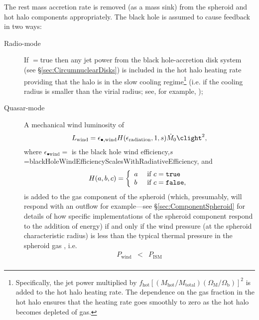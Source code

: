 The rest mass accretion rate is removed (as a mass sink) from the spheroid and hot halo components appropriately. The black hole is assumed to cause feedback in two ways:
\begin{description}
 \item [Radio-mode] If {\normalfont \ttfamily [blackHoleHeatsHotHalo]}$=${\normalfont \ttfamily true} then any jet power from the black hole-accretion disk system (see \S\ref{sec:CircumnuclearDisks}) is included in the hot halo heating rate providing that the halo is in the slow cooling regime\footnote{Specifically, the jet power multiplied by $f_\mathrm{hot} [(M_\mathrm{hot}/M_\mathrm{total}) (\Omega_\mathrm{M}/\Omega_\mathrm{b})]^2$ is added to the hot halo heating rate. The dependence on the gas fraction in the hot halo ensures that the heating rate goes smoothly to zero as the hot halo becomes depleted of gas.} (i.e. if the cooling radius is smaller than the virial radius; see, for example, \citealt{benson_cold_2010});
 \item [Quasar-mode] A mechanical wind luminosity of \citep{ostriker_momentum_2010}
\begin{equation}
 L_\mathrm{wind} = \epsilon_{\bullet, \mathrm{wind}} H(\epsilon_\mathrm{radiation},1,s) \dot{M}_0 \clight^2,
\end{equation}
where $\epsilon_{\bullet \mathrm{wind}}=${\normalfont \ttfamily [blackHoleWindEfficiency]} is the black hole wind efficiency,\newline $s$={\normalfont \ttfamily blackHoleWindEfficiencyScalesWithRadiativeEfficiency}, and
\begin{equation}
H(a,b,c) = \left\{\begin{array}{ll}a & \hbox{ if } c=\hbox{\normalfont \ttfamily true} \\b & \hbox{ if } c=\hbox{\normalfont \ttfamily false},\end{array}\right.
\end{equation}
is added to the gas \gls{component} of the spheroid (which, presumably, will respond with an outflow for example---see \S\ref{sec:ComponentSpheroid} for details of how specific implementations of the spheroid component respond to the addition of energy) if and only if the wind pressure (at the spheroid characteristic radius) is less than the typical thermal pressure in the spheroid gas \citep{ciotti_feedbackcentral_2009}, i.e.
\begin{eqnarray}
 P_\mathrm{wind} &<& P_\mathrm{ISM} \nonumber \\

\end{eqnarray}
\end{description}
